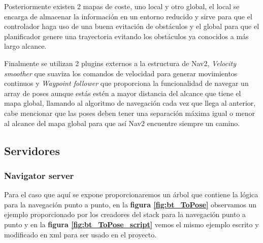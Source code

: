 Posteriormente existen 2 mapas de coste, uno local y otro global, el local se encarga de almacenar la información en un entorno reducido y sirve 
para que el controlador haga uso de una buena evitación de obstáculos  y el global para que el planificador genere una trayectoria evitando los obstáculos ya conocidos a más largo alcance.

Finalmente se utilizan 2 plugins externos a la estructura de Nav2, \textit{Velocity smoother} que suaviza los comandos de velocidad para generar movimientos continuos y 
\textit{Waypoint follower} que proporciona la funcionalidad de navegar un array de poses aunque estás estén a mayor distancia del alcance que tiene 
el mapa global, llamando al algoritmo de navegación cada vez que llega al anterior, cabe mencionar que las poses deben tener una separación máxima igual o menor al 
alcance del mapa global para que así Nav2 encuentre siempre un camino.


\subsection{Servidores}
\subsubsection{Navigator server}
Para el caso que aquí se expone proporcionaremos un árbol que contiene la lógica para la navegación punto a punto, en la \textbf{figura \ref{fig:bt_ToPose}} observamos un ejemplo proporcionado por 
los creadores del stack para la navegación punto a punto y en la \textbf{figura \ref{fig:bt_ToPose_script}} vemos el mismo ejemplo escrito y modificado en xml para ser usado en 
el proyecto.

